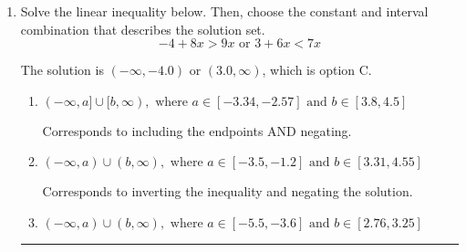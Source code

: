 \documentclass{extbook}[14pt]
\newcommand{\litem}[1]{\item #1

\rule{\textwidth}{0.4pt}}
\begin{document}
\begin{enumerate}
{The solution is \( [-7.80, 33.00) \), which is option D.\begin{enumerate}[label=\Alph*.]
\item \( (a, b], \text{ where } a \in [-12.8, -4.8] \text{ and } b \in [33, 36] \)

$(-7.80, 33.00]$, which corresponds to flipping the inequality.
\item \( (-\infty, a) \cup [b, \infty), \text{ where } a \in [-8.8, -3.8] \text{ and } b \in [31, 37] \)

$(-\infty, -7.80) \cup [33.00, \infty)$, which corresponds to displaying the and-inequality as an or-inequality AND flipping the inequality.
\item \( (-\infty, a] \cup (b, \infty), \text{ where } a \in [-11.8, -1.8] \text{ and } b \in [33, 35] \)

$(-\infty, -7.80] \cup (33.00, \infty)$, which corresponds to displaying the and-inequality as an or-inequality.
\item \( [a, b), \text{ where } a \in [-7.8, -3.8] \text{ and } b \in [33, 39] \)

$[-7.80, 33.00)$, which is the correct option.
\item \( \text{None of the above.} \)


\end{enumerate}

\textbf{General Comment:} To solve, you will need to break up the compound inequality into two inequalities. Be sure to keep track of the inequality! It may be best to draw a number line and graph your solution.
}
\litem{
Solve the linear inequality below. Then, choose the constant and interval combination that describes the solution set.
\[ -4 + 8 x > 9 x \text{ or } 3 + 6 x < 7 x \]

The solution is \( (-\infty, -4.0) \text{ or } (3.0, \infty) \), which is option C.\begin{enumerate}[label=\Alph*.]
\item \( (-\infty, a] \cup [b, \infty), \text{ where } a \in [-3.34, -2.57] \text{ and } b \in [3.8, 4.5] \)

Corresponds to including the endpoints AND negating.
\item \( (-\infty, a) \cup (b, \infty), \text{ where } a \in [-3.5, -1.2] \text{ and } b \in [3.31, 4.55] \)

Corresponds to inverting the inequality and negating the solution.
\item \( (-\infty, a) \cup (b, \infty), \text{ where } a \in [-5.5, -3.6] \text{ and } b \in [2.76, 3.25] \)


\end{enumerate}}
\end{enumerate}
\end{document}
